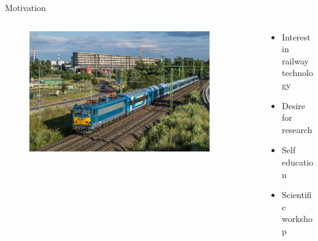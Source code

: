 \documentclass[aspectratio=169]{beamer}
\begin{document}
\begin{frame}{Motivation}
    \begin{columns}[T]
        \begin{column}{0.3\textwidth}
            \begin{figure}[H]
                \raggedleft
                \includegraphics[width=0.9\textwidth]{./tex_images/gigant.jpg}
            \end{figure}
        \end{column}
        \begin{column}{0.65\textwidth}
            \vspace*{0.5cm}
            \begin{itemize}
                \item Interest in railway technology
                \item Desire for research
                \item Self education
                \item <2-> \alert{Scientific workshop}
            \end{itemize}
        \end{column}
    \end{columns}


\end{frame}
\end{document}
